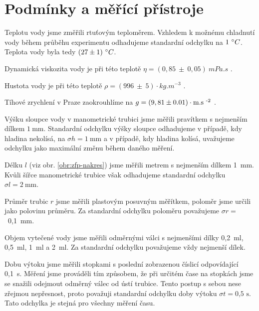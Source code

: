 \section*{Podmínky a měřící přístroje}
Teplotu vody jsme změřili rtuťovým teploměrem. Vzhledem k možnému chladnutí vody během průběhu experimentu odhadujeme standardní odchylku na $1 ~\degree C$. Teplota vody byla tedy $(27 \pm 1)~ \degree C$.

Dynamická viskozita vody je při této teplotě $\eta = (0,85 ~ \pm ~0,05)~ mPa . s$ \cite{viskozita}.

Hustota vody je při této teplotě $\rho = (996~\pm~5) \cdot kg.m^{-3}$ \cite{viskozita}.

Tíhové zrychlení v Praze zaokrouhlíme na $g=(9,81 \pm 0.01) \cdot \text{m.s \textsuperscript{-2}}$ \cite{tihovyzrychleni}.

Výšku sloupce vody v manometrické trubici jsme měřili pravítkem s nejmenším dílkem $1 ~\text{mm}$. Standardní odchylku výšky sloupce odhadujeme v případě, kdy hladina nekolísá, na $\sigma h = 1~\text{mm}$ a v případě, kdy hladina kolísá, uvažujeme odchylku jako maximální změnu během daného měření.

Délku $l$ (viz obr. \ref{obr:zfp-nakres}) jsme měřili metrem s nejmenším dílkem 1~mm. Kvůli šířce manometrické trubice však odhadujeme standardní odchylku $\sigma l = 2~\text{mm}$.

Průměr trubic $r$ jsme měřili plastovým posuvným měřítkem, poloměr jsme určili jako polovinu průměru. Za standardní odchylku poloměru považujeme $\sigma r =$~0,1~mm.

Objem vytečené vody jsme měřili odměrnými válci s nejmenšími dílky 0,2~ml, 0,5~ml, 1~ml a 2~ml. Za standardní odchylku považujeme vždy nejmenší dílek.

Dobu výtoku jsme měřili stopkami s poslední zobrazenou číslicí odpovídající 0,1~s. Měření jsme prováděli tím způsobem, že při určitém čase na stopkách jsme se snažili odejmout odměrný válec od ústí trubice. Tento postup s sebou nese zřejmou nepřesnost, proto považuji standardní odchylku doby výtoku $\sigma t = \text{0,5~s}$. Tato odchylka je stejná pro všechny měření času.